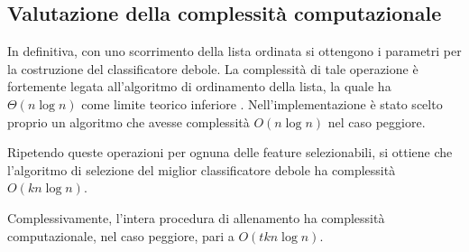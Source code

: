         \subsection{Valutazione della complessità computazionale}
            In definitiva, con uno scorrimento della lista ordinata si ottengono i parametri per la costruzione del classificatore debole. 
            La complessità di tale operazione è fortemente legata all'algoritmo di ordinamento della lista, la quale ha $\Theta(n\log n)$ come limite teorico inferiore \cite[p. 167]{Cormen09}.
            Nell'implementazione è stato scelto proprio un algoritmo che avesse complessità $O(n\log n)$ nel caso peggiore. 

            Ripetendo queste operazioni per ognuna delle feature selezionabili, si ottiene che l'algoritmo di selezione del miglior classificatore debole ha complessità $O(kn \log n)$.

            Complessivamente, l'intera procedura di allenamento ha complessità computazionale, nel caso peggiore, pari a $O(tkn \log n)$.
